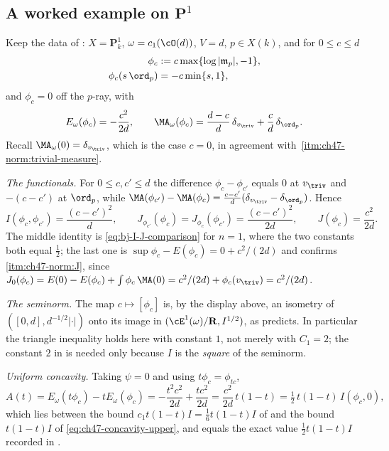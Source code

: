 \subsection{A worked example on \texorpdfstring{$\mathbf P^1$}{P1}}
\label{sec:ch47-p1-numbers}

\begin{example}
\label{ex:ch47-p1-numbers}
Keep the data of : $X=\mathbf P^1_k$,
$\omega=c_1(\cO(d))$, $V=d$, $p\in X(k)$, and for $0\le c\le d$
\[
 \begin{aligned}
  \phi_c&:=c\max\{\log|\mathfrak m_p|,-1\},\\
  \phi_c(s\,\ord_p)&=-c\min\{s,1\},
 \end{aligned}
\]
and $\phi_c=0$ off the $p$-ray, with
\[
 E_\omega(\phi_c)=-\frac{c^2}{2d},
 \qquad
 \MA_\omega(\phi_c)=\frac{d-c}{d}\,\delta_{v_{\triv}}
                    +\frac{c}{d}\,\delta_{\ord_p}.
\]
Recall $\MA_\omega(0)=\delta_{v_{\triv}}$, which is the case $c=0$, in
agreement with
\,\cref{itm:ch47-norm:trivial-measure}.

\emph{The functionals.}  For $0\le c,c'\le d$ the difference
$\phi_c-\phi_{c'}$ equals $0$ at $v_{\triv}$ and $-(c-c')$ at
$\ord_p$, while
$\MA(\phi_{c'})-\MA(\phi_c)=\frac{c-c'}{d}(\delta_{v_{\triv}}
-\delta_{\ord_p})$.  Hence
\[
 I(\phi_c,\phi_{c'})=\frac{(c-c')^2}{d},
 \qquad
 J_{\phi_{c'}}(\phi_c)=J_{\phi_c}(\phi_{c'})=\frac{(c-c')^2}{2d},
 \qquad
 J(\phi_c)=\frac{c^2}{2d}.
\]
The middle identity is \eqref{eq:bj-I-J-comparison} for $n=1$, where the
two constants both equal $\tfrac12$; the last one is
$\sup\phi_c-E(\phi_c)=0+c^2/(2d)$ and confirms
\,\cref{itm:ch47-norm:J}, since
$J_0(\phi_c)=E(0)-E(\phi_c)+\int\phi_c\,\MA(0)=c^2/(2d)+\phi_c(v_{\triv})
=c^2/(2d)$.

\emph{The seminorm.}  The map $c\mapsto[\phi_c]$ is, by the display
above, an isometry of $([0,d],d^{-1/2}|\cdot|)$ onto its image in
$(\cE^1(\omega)/\mathbf R,I^{1/2})$, as
 predicts.  In particular the triangle
inequality holds here with constant $1$, not merely with $C_1=2$; the
constant $2$ in  is needed only because
$I$ is the \emph{square} of the seminorm.

\emph{Uniform concavity.}  Taking $\psi=0$ and using
$t\phi_c=\phi_{tc}$,
\[
 A(t)=E_\omega(t\phi_c)-tE_\omega(\phi_c)
 =-\frac{t^2c^2}{2d}+\frac{tc^2}{2d}
 =\frac{c^2}{2d}\,t(1-t)
 =\tfrac12\,t(1-t)\,I(\phi_c,0),
\]
which lies between the bound $c_1t(1-t)I=\tfrac16t(1-t)I$ of
 and the bound $t(1-t)I$ of
\eqref{eq:ch47-concavity-upper}, and equals the exact value
$\tfrac12t(1-t)I$ recorded in
.


\end{example}
